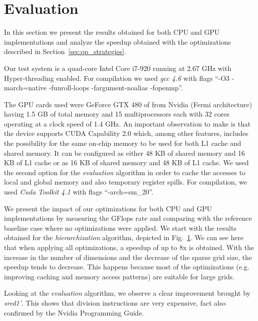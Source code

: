 \section{Evaluation}

In this section we present the results obtained for both CPU and GPU
implementations and analyze the speedup obtained with the optimizations
described in Section~\ref{sec:op_strategies}.

Our test system is a quad-core Intel Core i7-920 running at 2.67 GHz with
Hyper-threading enabled. For compilation we used \textit{gcc 4.6} with flags
``-O3 -march=native -funroll-loops -fargument-noalias -fopenmp''.

The GPU cards used were GeForce GTX 480 of from Nvidia (Fermi architecture)
having 1.5 GB of total memory and 15 multiprocessors each with 32 cores
operating at a clock speed of 1.4 GHz. An important observation to make is that
the device supports CUDA Capability 2.0 which, among other features, includes
the possibility for the same on-chip memory to be used for both L1 cache and shared
memory. It can be configured as either 48 KB of shared memory and 16 KB of L1
cache or as 16 KB of shared memory and 48 KB of L1 cache. We used the second
option for the \textit{evaluation} algorithm in order to cache the accesses to
local and global memory and also temporary register spills. For compilation, we
used \textit{Cuda Toolkit 4.1} with flags ``-arch=sm\_20''.

We present the impact of our optimizations for both CPU and GPU implementations
by measuring the GFlops rate and comparing with the reference baseline case
where no optimizations were applied. We start with the results obtained for the
\textit{hierarchization} algorithm, depicted in Fig.~\ref{}. We can see here
that when applying all optimizations, a speedup of up to 8x is obtained. With
the increase in the number of dimensions and the decrease of the sparse grid
size, the speedup tends to decrease. This happens because most of the
optimizations (e.g. improving caching and memory access patterns) are suitable
for large grids.

Looking at the \textit{evaluation} algorithm, we observe a clear improvement
brought by \textit{sred1'}. This shows that division instructions are very
expensive, fact also confirmed by the Nvidia Programming Guide.
